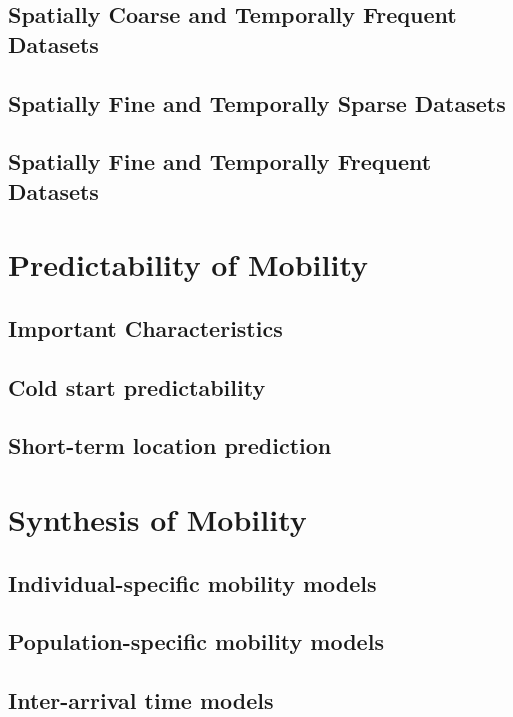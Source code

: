 \documentclass[journal]{IEEEtran}
\begin{document}
\subsection{Spatially Coarse and Temporally Frequent Datasets}

\subsection{Spatially Fine and Temporally Sparse Datasets}

\subsection{Spatially Fine and Temporally Frequent Datasets}



\section{Predictability of Mobility} \label{sec:predict}

\subsection{Important Characteristics}

\subsection{Cold start predictability}

\subsection{Short-term location prediction}


\section{Synthesis of Mobility} \label{sec:synthesis}

\subsection{Individual-specific mobility models}

\subsection{Population-specific mobility models}

\subsection{Inter-arrival time models}
\end{document}
